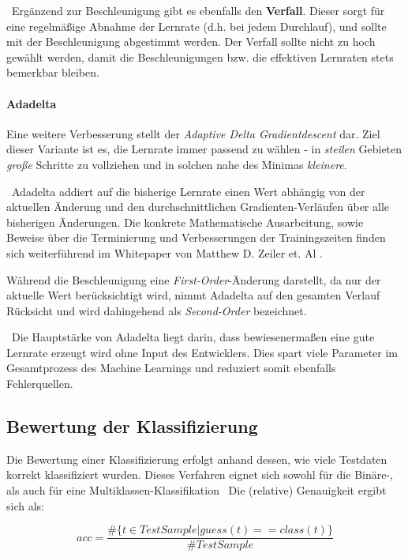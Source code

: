 ~\newline Ergänzend zur Beschleunigung gibt es ebenfalls den \textbf{Verfall}. Dieser sorgt für eine regelmäßige Abnahme der Lernrate (d.h. bei jedem Durchlauf), und sollte mit der Beschleunigung abgestimmt werden. Der Verfall sollte nicht zu hoch gewählt werden, damit die Beschleunigungen bzw. die effektiven Lernraten stets bemerkbar bleiben. 
\paragraph{Adadelta} Eine weitere Verbesserung stellt der \textit{Adaptive Delta Gradientdescent} dar. Ziel dieser Variante ist es, die Lernrate immer passend zu wählen - in \textit{steilen} Gebieten \textit{große} Schritte zu vollziehen und in solchen nahe des Minimas \textit{kleinere}.

~\newline Adadelta addiert auf die bisherige Lernrate einen Wert abhängig von der aktuellen Änderung und den durchschnittlichen Gradienten-Verläufen über alle bisherigen Änderungen. Die konkrete Mathematische Ausarbeitung, sowie Beweise über die Terminierung und Verbesserungen der Trainingszeiten finden sich weiterführend im Whitepaper von Matthew D. Zeiler et. Al \cite{AdaDelta}.

Während die Beschleunigung eine \textit{First-Order}-Änderung darstellt, da nur der aktuelle Wert berücksichtigt wird, nimmt Adadelta auf den gesamten Verlauf Rücksicht und wird dahingehend als \textit{Second-Order} bezeichnet. 

~\newline Die Hauptstärke von Adadelta liegt darin, dass bewiesenermaßen eine gute Lernrate erzeugt wird ohne Input des Entwicklers. Dies spart viele Parameter im Gesamtprozess des Machine Learnings und reduziert somit ebenfalls Fehlerquellen.
\subsection{Bewertung der Klassifizierung}
Die Bewertung einer Klassifizierung erfolgt anhand dessen, wie viele Testdaten korrekt klassifiziert wurden. Dieses Verfahren eignet sich sowohl für die Binäre-, als auch für eine Multiklassen-Klassifikation
~\newline Die (relative) Genauigkeit ergibt sich als: 

\begin{equation}
	acc = \dfrac{\#\{t \in  TestSample | guess(t)==class(t)\}}{\#TestSample}
\end{equation}